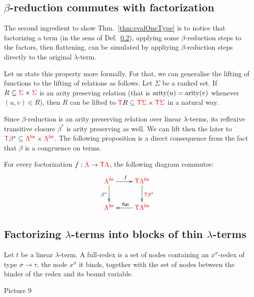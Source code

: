 \subsection{$\beta$-reduction commutes with factorization} The second ingredient to show Thm.~\ref{thm:evalOneType} is to notice  that factorizing a term (in the sens of Def.~\ref{}), applying some $\beta$-reduction steps to the factors, then flattening, can be simulated by appliying  $\beta$-reduction steps directly to the original $\lambda$-term.

Let us state this property more formally. For that, we can generalise the lifting of functions to the lifting of relations as follows. 
Let $\Sigma$ be a ranked set. If $R\subseteq {\color{red}{\Sigma}}\times{\color{red}{\Sigma}}$ is an arity preseving relation (that is $\mathrm{arity}(u)=\mathrm{arity}(v)$ whenever $(u,v)\in R$), then $R$ can be lifted to ${\color{red}{\mathsf T}} R\subseteq {\color{red}{{\color{red}{\mathsf T}}\Sigma}} \times {\color{red}{{\color{red}{\mathsf T}}\Sigma}}$ in a natural way. 

Since $\beta$-reduction is an arity preserving relation  over linear $\lambda$-terms, its reflexive transitive closure $\beta^*$ is arity preserving as well.  We can lift then the later to ${\color{red}{\mathsf T}} \beta^*\subseteq {\color{red}{\Lambda^{\sf{lin}}}}\times{\color{red}{\Lambda^{\sf{lin}}}}$.
The following proposition is a direct consequence from the fact that $\beta$ is a congruence on terms.
  
\begin{proposition}\label{prop:betaCommutesWithFacto}
For every foctorization $f:{\color{red}{\Lambda}} \to {\color{red}{\mathsf T}} {\color{red}{\Lambda}}$, the following diagram commutes:
\begin{align*}
        \xymatrix{
     \rlambdalin \ar[d]_{\beta^*}\ar[r]^f& \tmonad \rlambdalin \ar[d]^{\tmonad\beta^*} \\
           \rlambdalin  &\ar[l]_{\sf{flat}} \tmonad \rlambdalin
        }
        \end{align*}
\end{proposition}



\subsection{Factorizing $\lambda$-terms into blocks of thin $\lambda$-terms}

\begin{definition}
Let $t$ be a linear $\lambda$-term. A full-redex is a set of nodes  containing an $x^\sigma$-redex of type $\sigma\rightarrow\tau$, the node $x^\sigma$ it binds, together with the set of nodes between the binder of the redex and its bound variable.  
\end{definition}
\begin{center}
Picture 9
\end{center}


